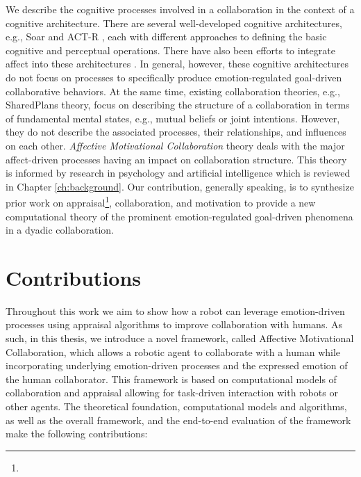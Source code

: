 \documentclass[12pt]{report}
\begin{document}
We describe the cognitive processes involved in a collaboration in the context
of a cognitive architecture. There are several well-developed cognitive
architectures, e.g., Soar \cite{laird:soar} and ACT-R \cite{anderson:act-r},
each with different approaches to defining the basic cognitive and perceptual
operations. There have also been efforts to integrate affect into these
architectures \cite{dancy:actR-physiology-affect, marinier:behavior-emotion}. In
general, however, these cognitive architectures do not focus on processes to
specifically produce emotion-regulated goal-driven collaborative behaviors. At
the same time, existing collaboration theories, e.g., SharedPlans
\cite{grosz:plans-discourse} theory, focus on describing the structure of a
collaboration in terms of fundamental mental states, e.g., mutual beliefs or
joint intentions. However, they do not describe the associated processes, their
relationships, and influences on each other. \textit{Affective Motivational
Collaboration} theory deals with the major affect-driven processes having an
impact on collaboration structure. This theory is informed by research in
psychology and artificial intelligence which is reviewed in Chapter
\ref{ch:background}. Our contribution, generally speaking, is to synthesize
prior work on appraisal\footnote{\color{red}{We have chosen appraisal-based
modeling of emotions among several theories of emotions.}}, collaboration, and
motivation to provide a new computational theory of the prominent emotion-regulated
goal-driven phenomena in a dyadic collaboration.

\section{Contributions}

Throughout this work we aim to show how a robot can leverage emotion-driven
processes using appraisal algorithms to improve collaboration with humans. As
such, in this thesis, we introduce a novel framework, called Affective
Motivational Collaboration, which allows a robotic agent to collaborate with a
human while incorporating underlying emotion-driven processes and the expressed
emotion of the human collaborator. This framework is based on computational
models of collaboration and appraisal allowing for task-driven interaction with
robots or other agents. The theoretical foundation, computational models and
algorithms, as well as the overall framework, and the end-to-end evaluation of
the framework make the following contributions:
\end{document}
